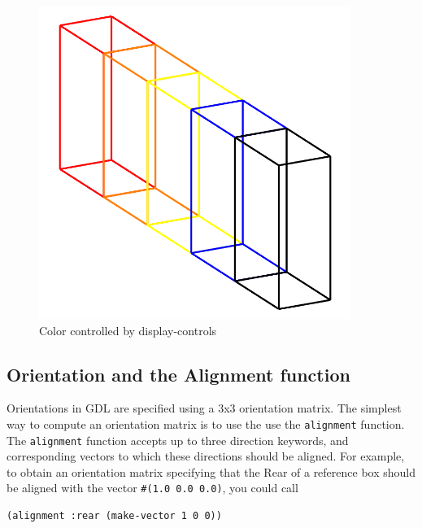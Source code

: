 \documentclass [11pt]{book}
\begin{document}
\begin{figure}
\begin{center}
\includegraphics[width=4in,height=4in]{../images/display-color.pdf}
\end{center}

\caption{Color controlled by display-controls}

\label{fig:display-color}

\end{figure}


\subsection{Orientation and the Alignment function}

\label{subsec:orientationandthealignmentfunction}



Orientations in GDL are specified using a 3x3 orientation
matrix. The simplest way to compute an orientation matrix is to use
the use the \texttt{alignment} function. The \texttt{alignment} function accepts up to three direction keywords, and
corresponding vectors to which these directions should be aligned. For
example, to obtain an orientation matrix specifying that the Rear of a
reference box should be aligned with the vector \texttt{\#(1.0 0.0 0.0)}, you could call 

\begin{verbatim}(alignment :rear (make-vector 1 0 0))
\end{verbatim}
\end{document}
